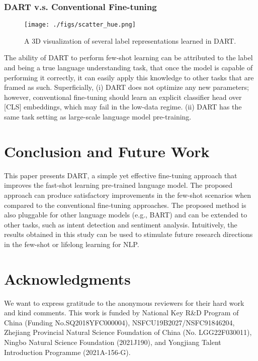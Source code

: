 \documentclass{article} \usepackage{iclr2022_conference,times}
\begin{document}
\subsubsection*{DART v.s. Conventional Fine-tuning}

\begin{wrapfigure}{r}{0.4\textwidth}
\centering
\vspace{-10mm}
\texttt{[image: ./figs/scatter\_hue.png]} 
\vspace{-4mm}
\caption{A 3D visualization of several label representations learned in DART.}
\vspace{-10mm}
\label{fig:scatter}
\end{wrapfigure} 

The ability of DART to perform few-shot learning can be attributed to the label and being a true language understanding task, that once the model is capable of performing it correctly, it can easily apply this knowledge to other tasks that are framed as such. 
Superficially, 
(i) DART does not optimize any new parameters; however, conventional fine-tuning should learn an explicit classifier head over [CLS] embeddings, which may fail in the low-data regime. 
(ii) DART has the same task setting as large-scale language model pre-training.



\section{Conclusion and Future Work}
This paper presents DART, a simple yet effective fine-tuning approach that improves the fast-shot learning pre-trained language model.
The proposed approach can produce satisfactory improvements in the few-shot scenarios when compared to the conventional fine-tuning approaches.
The proposed method is also pluggable for other language models (e.g., BART) and can be extended to other tasks, such as intent detection and sentiment analysis. 
Intuitively, the results obtained in this study can be used to stimulate future research directions in the few-shot or lifelong learning for NLP.
\section*{Acknowledgments}
We  want to express gratitude to the anonymous reviewers for their hard work and kind comments. This work is funded by National Key R\&D Program of China (Funding No.SQ2018YFC000004), NSFCU19B2027/NSFC91846204, Zhejiang Provincial Natural Science Foundation of China (No. LGG22F030011), Ningbo Natural Science Foundation (2021J190), and Yongjiang Talent Introduction Programme (2021A-156-G). 
\end{document}

